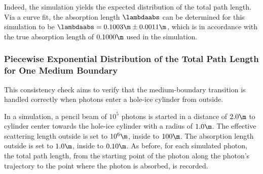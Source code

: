 
Indeed, the simulation yields the expected distribution of the total path length. Via a curve fit, the absorption length $\lambdaabs$ can be determined for this simulation to be $\lambdaabs = 0.1003\m \pm 0.0011\m$, which is in accordance with the true absorption length of $0.1000\m$ used in the simulation.


\subsubsection{Piecewise Exponential Distribution of the Total Path Length for One Medium Boundary}


This consistency check aims to verify that the medium-boundary transition is handled correctly when photons enter a hole-ice cylinder from outside.


%

In a simulation, a pencil beam of $10^5$ photons is started in a distance of $2.0\m$ to cylinder center towards the hole-ice cylinder with a radius of $1.0\m$. The effective scattering length outside is set to $10^6\m$, inside to $100\m$. The absorption length outside is set to $1.0\m$, inside to $0.10\m$.
As before, for each simulated photon, the total path length, from the starting point of the photon along the photon's trajectory to the point where the photon is absorbed, is recorded.


